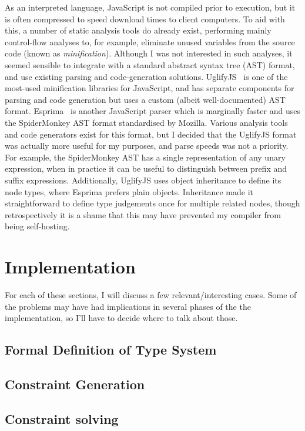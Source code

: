 \documentclass[12pt,a4paper,twoside,openright]{report}
\begin{document}
As an interpreted language, JavaScript is not compiled prior to execution, but
it is often compressed to speed download times to client computers. To aid with
this, a number of static analysis tools do already exist, performing mainly
control-flow analyses to, for example, eliminate unused variables from the
source code (known as \textit{minification}). Although I was not interested in
such analyses, it seemed sensible to integrate with a standard abstract syntax
tree (AST) format, and use existing parsing and code-generation solutions.
UglifyJS~\cite{uglify} is one of the most-used minification libraries for
JavaScript, and has separate components for parsing and code generation but
uses a custom (albeit well-documented) AST format. Esprima~\cite{esprima} is
another JavaScript parser which is marginally faster and uses the SpiderMonkey
AST format standardised by Mozilla. Various analysis tools and code generators
exist for this format, but I decided that the UglifyJS format was actually more
useful for my purposes, and parse speeds was not a priority. For example, the
SpiderMonkey AST has a single representation of any unary expression, when in
practice it can be useful to distinguish between prefix and suffix expressions.
Additionally, UglifyJS uses object inheritance to define its node types, where
Esprima prefers plain objects. Inheritance made it straightforward to define
type judgements once for multiple related nodes, though retrospectively it is a
shame that this may have prevented my compiler from being self-hosting.

\chapter{Implementation}\label{implementation}

For each of these sections, I will discuss a few relevant/interesting
cases. Some of the problems may have had implications in several
phases of the the implementation, so I'll have to decide where to talk
about those. 

\section{Formal Definition of Type System}
\section{Constraint Generation}
\section{Constraint solving}
\end{document}
